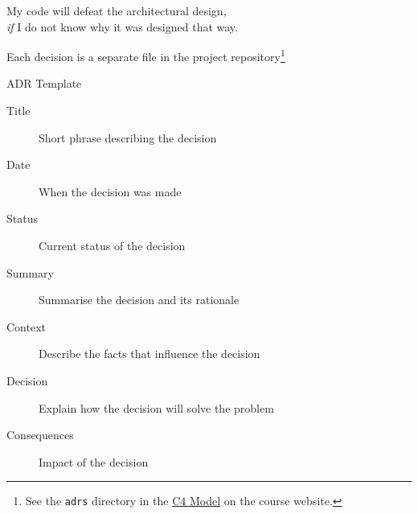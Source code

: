 \documentclass{slide}
\begin{document}
{My code will defeat the architectural design,\\
\emph{if} I do not know why it was designed that way.}



{Each decision is a separate file in the project repository\footnote{See the \texttt{adrs} directory
in the \href{https://csse6400.uqcloud.net/resources/c4_model.zip}{C4 Model} on the course website.}}


\begin{frame}{ADR Template \cite{nygard-adr}}

\Large{
\begin{description}
    \item[Title] Short phrase describing the decision
    \item[Date] When the decision was made
    \item[Status] Current status of the decision
    \item[Summary] Summarise the decision and its rationale
    \item[Context] Describe the facts that influence the decision
    \item[Decision] Explain how the decision will solve the problem
    \item[Consequences] Impact of the decision
\end{description}
}

\end{frame}
\end{document}
